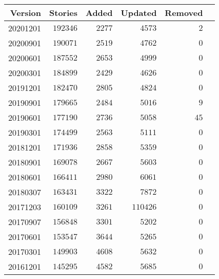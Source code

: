 \documentclass[hidelinks,a4paper,12pt]{article}
\begin{document}
\begin{center}
\begin{tabular}{|r|r|r|r|r|r|} \hline
\textbf{Version} & \textbf{Stories} & \textbf{Added} & \textbf{Updated} & \textbf{Removed} \\ \hline
20201201         & $192346$         & $2277$         & $4573$           & $2$              \\ \hline
20200901         & $190071$         & $2519$         & $4762$           & $0$              \\ \hline
20200601         & $187552$         & $2653$         & $4999$           & $0$              \\ \hline
20200301         & $184899$         & $2429$         & $4626$           & $0$              \\ \hline
20191201         & $182470$         & $2805$         & $4824$           & $0$              \\ \hline
20190901         & $179665$         & $2484$         & $5016$           & $9$              \\ \hline
20190601         & $177190$         & $2736$         & $5058$           & $45$             \\ \hline
20190301         & $174499$         & $2563$         & $5111$           & $0$              \\ \hline
20181201         & $171936$         & $2858$         & $5359$           & $0$              \\ \hline
20180901         & $169078$         & $2667$         & $5603$           & $0$              \\ \hline
20180601         & $166411$         & $2980$         & $6061$           & $0$              \\ \hline
20180307         & $163431$         & $3322$         & $7872$           & $0$              \\ \hline
20171203         & $160109$         & $3261$         & $110426$         & $0$              \\ \hline
20170907         & $156848$         & $3301$         & $5202$           & $0$              \\ \hline
20170601         & $153547$         & $3644$         & $5265$           & $0$              \\ \hline
20170301         & $149903$         & $4608$         & $5632$           & $0$              \\ \hline
20161201         & $145295$         & $4582$         & $5685$           & $0$              \\ \hline

\end{tabular}
\end{center}
\end{document}
